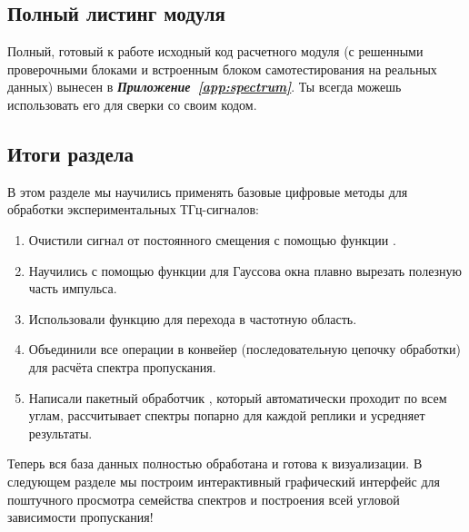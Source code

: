 \subsection{Полный листинг модуля}

Полный, готовый к работе исходный код расчетного модуля  (с решенными проверочными блоками и встроенным блоком самотестирования на реальных данных) вынесен в \textbf{\textit{Приложение~\ref{app:spectrum}}}. Ты всегда можешь использовать его для сверки со своим кодом.

\subsection{Итоги раздела}
В этом разделе мы научились применять базовые цифровые методы для обработки экспериментальных ТГц-сигналов:
\begin{enumerate}
	\item Очистили сигнал от постоянного смещения с помощью функции .
	\item Научились с помощью функции  для Гауссова окна плавно вырезать полезную часть импульса.
	\item Использовали функцию  для перехода в частотную область.
	\item Объединили все операции в конвейер (последовательную цепочку обработки)  для расчёта спектра пропускания.
	\item Написали пакетный обработчик , который автоматически проходит по всем углам, рассчитывает спектры попарно для каждой реплики и усредняет результаты.
\end{enumerate}

Теперь вся база данных полностью обработана и готова к визуализации. В следующем разделе мы построим интерактивный графический интерфейс для поштучного просмотра семейства спектров и построения всей угловой зависимости пропускания!
